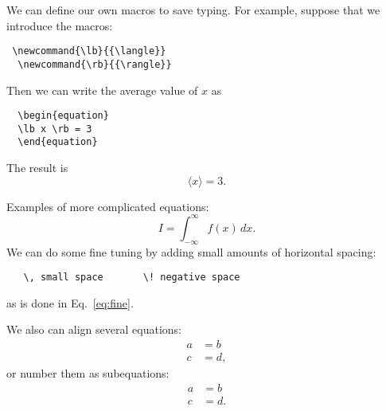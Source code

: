 \documentclass[12pt]{article}
\begin{document}
We can define our own macros to save typing. For example, suppose
that we introduce the macros:
\begin{verbatim}
 \newcommand{\lb}{{\langle}}
  \newcommand{\rb}{{\rangle}}
  \end{verbatim}
  \newcommand{\lb}{{\langle}}
  \newcommand{\rb}{{\rangle}}
  Then we can write the average value of $x$ as
  \begin{verbatim}
  \begin{equation}
  \lb x \rb = 3
  \end{equation}
  \end{verbatim}
  The result is
  \begin{equation}
	  \lb x \rb = 3 .
  \end{equation}

  Examples of more complicated equations:
  \begin{equation}
	  I = \! \int_{-\infty}^\infty f(x)\,dx \label{eq:fine}.
  \end{equation}
  We can do some fine tuning by adding small amounts of horizontal
  spacing:
  \begin{verbatim}
   \, small space       \! negative space
   \end{verbatim}
   as is done in Eq.~\eqref{eq:fine}.

   We also can align several equations:
   \begin{align}
	   a & = b \\
	   c &= d ,
   \end{align}
   or number them as subequations:
   \begin{subequations}
	   \begin{align}
		   a & = b \\
		   c &= d .
	   \end{align}
   \end{subequations}
\end{document}
